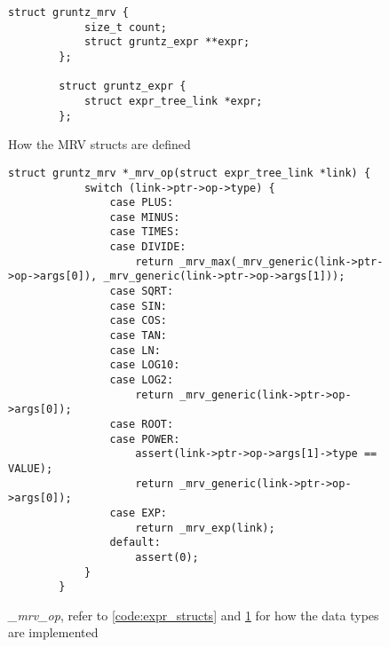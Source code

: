 \begin{figure}
	\centering
	\begin{lstlisting}[style=CStyle]
		struct gruntz_mrv {
			size_t count;
			struct gruntz_expr **expr;
		};
		
		struct gruntz_expr {
			struct expr_tree_link *expr;
		};
	\end{lstlisting}
	\caption{How the MRV structs are defined} \label{code:mrv_structs}
\end{figure}

\begin{figure}
	\centering
	\begin{lstlisting}[style=CStyle]
		struct gruntz_mrv *_mrv_op(struct expr_tree_link *link) {
			switch (link->ptr->op->type) {
				case PLUS:
				case MINUS:
				case TIMES:
				case DIVIDE:
					return _mrv_max(_mrv_generic(link->ptr->op->args[0]), _mrv_generic(link->ptr->op->args[1]));
				case SQRT:
				case SIN:
				case COS:
				case TAN:
				case LN:
				case LOG10:
				case LOG2:
					return _mrv_generic(link->ptr->op->args[0]);
				case ROOT:
				case POWER:
					assert(link->ptr->op->args[1]->type == VALUE);
					return _mrv_generic(link->ptr->op->args[0]);
				case EXP:
					return _mrv_exp(link);
				default:
					assert(0);
			}
		}
	\end{lstlisting}
	\caption{\textit{\_mrv\_op}, refer to \cref{code:expr_structs} and \cref{code:mrv_structs} for how the data types are implemented} \label{code:mrv_op}
\end{figure}